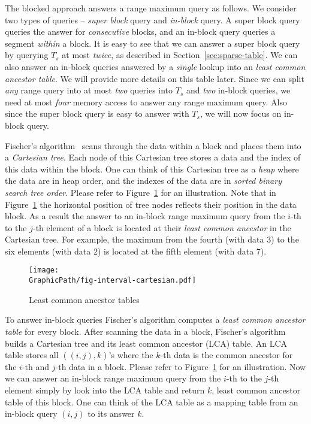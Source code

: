 The blocked approach answers a range maximum query as follows.  We
consider two types of queries -- {\em super block} query and {\em
  in-block} query.  A super block query queries the answer for {\em
  consecutive} blocks, and an in-block query queries a segment {\em
  within} a block.  It is easy to see that we can answer a super block
query by querying $T_s$ at most {\em twice}, as described in
Section~\ref{sec:sparse-table}.  We can also answer an in-block
queries answered by a {\em single} lookup into an {\em least common
  ancestor table}.  We will provide more details on this table later.
Since we can split {\em any} range query into at most {\em two}
queries into $T_s$ and {\em two} in-block queries, we need at most
{\em four} memory access to answer any range maximum query.  Also
since the super block query is easy to answer with $T_s$, we will now
focus on in-block query.

Fischer's algorithm~\cite{Fischer2006TheoreticalAP} scans through the
data within a block and places them into a {\em Cartesian tree}.  Each
node of this Cartesian tree stores a data and the index of this data
within the block.  One can think of this Cartesian tree as a {\em
  heap} where the data are in heap order, and the indexes of the data
are in {\em sorted binary search tree order}.  Please refer to
Figure~\ref{fig:ancesstor-cartesian} for an illustration.  Note that
in Figure~\ref{fig:ancesstor-cartesian} the horizontal position of
tree nodes reflects their position in the data block.  As a result the
answer to an in-block range maximum query from the $i$-th to the
$j$-th element of a block is located at their {\em least common
  ancestor} in the Cartesian tree.  For example, the maximum from the
fourth (with data 3) to the six elements (with data 2) is located at
the fifth element (with data 7).

\begin{figure}[!thb]   
  \centering
  \texttt{[image: \\GraphicPath/fig-interval-cartesian.pdf]}
  \caption{Least common ancestor tables}
  \label{fig:ancesstor-cartesian}
\end{figure}

To answer in-block queries Fischer's algorithm computes a {\em least
common ancestor table} for every block.  After scanning the data in a
block, Fischer's algorithm builds a Cartesian tree and its least common
ancestor (LCA) table.  An LCA table stores all $((i, j), k)$'s where the
$k$-th data is the common ancestor for the $i$-th and $j$-th data in a
block.  Please refer to Figure~\ref{fig:ancesstor-cartesian} for an
illustration.  Now we can answer an in-block range maximum query from
the $i$-th to the $j$-th element simply by look into the LCA table and
return $k$,  least common ancestor table of this block.  One can think
of the LCA table as a mapping table from an in-block query $(i, j)$ to
its answer $k$.

